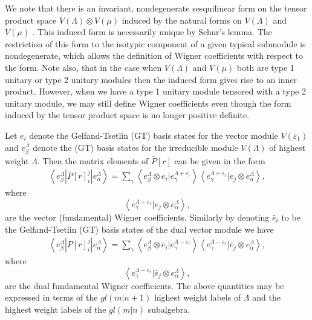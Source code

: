 \documentclass[12pt]{article}
\begin{document}
We note that there is an invariant,
nondegenerate sesquilinear form on the tensor product space $V(\Lambda) \otimes V(\mu)$ induced by the natural forms on $ V(\Lambda)$ and $V(\mu)$ \cite{GIW1}. This induced form is necessarily unique by Schur's lemma. The restriction of this form to the isotypic component of a given typical submodule is nondegenerate, which allows the definition of Wigner coefficients with respect to the form. Note also, that in the case when $V(\Lambda)$ and $V(\mu)$ both are type 1 unitary or type 2 unitary modules then the induced form gives rise to an inner product. However, when we have a type 1 unitary module tensored with a type 2 unitary module, we may still define Wigner coefficients even though the form induced by the tensor product space is no longer positive definite.

Let $e_i$ denote the Gelfand-Tsetlin (GT) basis states for the vector module $V(\varepsilon_1)$ and ${e^\Lambda_\beta}$ denote the (GT) basis states for the irreducible module $V(\Lambda)$ of highest weight $\Lambda$. Then the matrix elements of $\bar{P}[r]$ can be given in the form
\begin{align}
\left\langle e^\Lambda_\beta | \bar{P}[r]^j_i | e^{\Lambda}_\alpha \right\rangle =
\sum_\gamma \left\langle e^\Lambda_\beta \otimes e_i | e^{\Lambda + \varepsilon_r}_\gamma \right\rangle
\left\langle e^{\Lambda+\varepsilon_r}_\gamma | e_j \otimes e^\Lambda_\alpha \right\rangle, \label{BarPij}
\end{align}
where
$$
\left\langle e^{\Lambda+\varepsilon_r}_\gamma | e_j \otimes e^\Lambda_\alpha \right\rangle,
$$
are the vector (fundamental) Wigner coefficients.
Similarly by denoting $\bar{e}_i$ to be the Gelfand-Tsetlin (GT) basis states of the dual vector module we have 
\begin{align}
\left\langle e^\Lambda_\beta | P[r]^j_i | e^{\Lambda}_\alpha \right\rangle =
\sum_\gamma \left\langle e^\Lambda_\beta \otimes \bar{e}_i | e^{\Lambda - \varepsilon_r}_\gamma \right\rangle
\left\langle e^{\Lambda-\varepsilon_r}_\gamma | \bar{e}_j \otimes e^\Lambda_\alpha \right\rangle, \label{Pij}
\end{align}
where
$$
\left\langle e^{\Lambda-\varepsilon_r}_\gamma | \bar{e}_j \otimes e^\Lambda_\alpha \right\rangle,
$$
are the dual fundamental Wigner coefficients. The above quantities may be expressed in terms of the $gl(m|n+1)$ highest weight labels of $\Lambda$ and the highest weight labels of the $gl(m|n)$ subalgebra.
\end{document}
